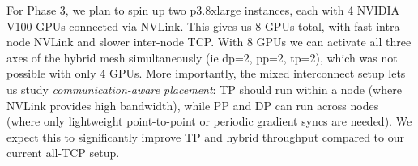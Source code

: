 \documentclass[conference]{IEEEtran}
\begin{document}
For Phase 3, we plan to spin up two p3.8xlarge instances, each with 4 NVIDIA V100 GPUs connected via NVLink. This gives us 8 GPUs total, with fast intra-node NVLink and slower inter-node TCP. With 8 GPUs we can activate all three axes of the hybrid mesh simultaneously (ie dp=2, pp=2, tp=2), which was not possible with only 4 GPUs. More importantly, the mixed interconnect setup lets us study \textit{communication-aware placement}: TP should run within a node (where NVLink provides high bandwidth), while PP and DP can run across nodes (where only lightweight point-to-point or periodic gradient syncs are needed). We expect this to significantly improve TP and hybrid throughput compared to our current all-TCP setup.





\end{document}
